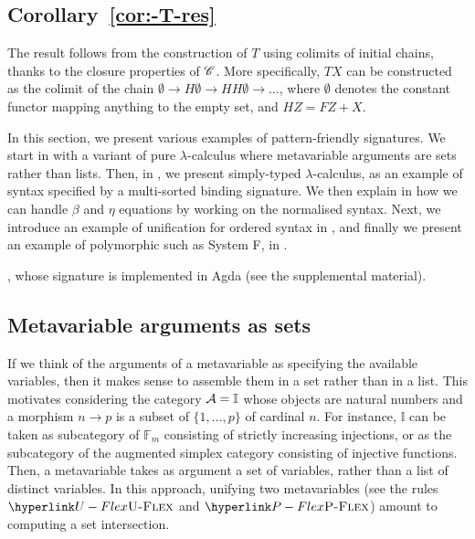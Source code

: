 \subsection{Corollary~\ref{cor:-T-res}}

\label{app:T-res}The result follows from the construction of $T$
using colimits of initial chains, thanks to the closure properties
of $\C$. More specifically, $TX$ can be constructed as the colimit
of the chain $\emptyset\rightarrow H\emptyset\rightarrow HH\emptyset\rightarrow\dots$,
where $\emptyset$ denotes the constant functor mapping anything to
the empty set, and $HZ=FZ+X$.


\label{app:applications}In this section, we present various examples
of pattern-friendly signatures. We start in 
with a variant of pure $\lambda$-calculus where metavariable arguments
are sets rather than lists. Then, in ,
we present simply-typed $\lambda$-calculus, as an example of syntax
specified by a multi-sorted binding signature. We then explain in
 how we can handle $\beta$ and $\eta$
equations by working on the normalised syntax. Next, we introduce
an example of unification for ordered syntax in ,
and finally we present an example of polymorphic such as System F,
in . \begin{full} , whose signature is implemented
in Agda (see the supplemental material). \end{full} 


\subsection{Metavariable arguments as sets}

\label{subsec:ex-arg-sets}If we think of the arguments of a metavariable
as specifying the available variables, then it makes sense to assemble
them in a set rather than in a list. This motivates considering the
category ${\cal A}=\mathbb{I}$ whose objects are natural numbers
and a morphism $n\rightarrow p$ is a subset of $\{1,\dots,p\}$ of
cardinal $n$. For instance, $\mathbb{I}$ can be taken as subcategory
of $\mathbb{F}_{m}$ consisting of strictly increasing injections,
or as the subcategory of the augmented simplex category consisting
of injective functions. Then, a metavariable takes as argument a set
of variables, rather than a list of distinct variables. In this approach,
unifying two metavariables (see the rules $\refrule{U-Flex}$ and
$\refrule{P-Flex}$) amount to computing a set intersection.

